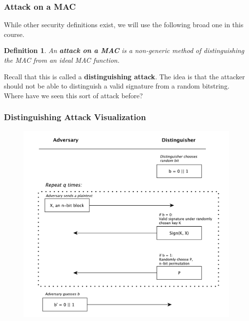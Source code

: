 \documentclass{beamer}
\newtheorem{defn}{Definition}[section]
\newcommand{\<}{\langle}
\renewcommand{\>}{\rangle}
\begin{document}
\begin{frame}
\frametitle{Attack on a MAC}

While other security definitions exist, we will use the following broad one in this course. \newline

\begin{defn}
An \textbf{attack on a MAC} is a non-generic method of distinguishing the MAC from an ideal MAC function.\newline
\end{defn}

Recall that this is called a \textbf{distinguishing attack}. The idea is that the attacker should not be able to distinguish a valid signature from a random bitstring. Where have we seen this sort of attack before?
\end{frame}


\begin{frame}
\frametitle{Distinguishing Attack Visualization}

\begin{figure}
\centering
\includegraphics[scale=.4]{IMG/MACdistinguisher}
\end{figure}
\end{frame}
\end{document}
